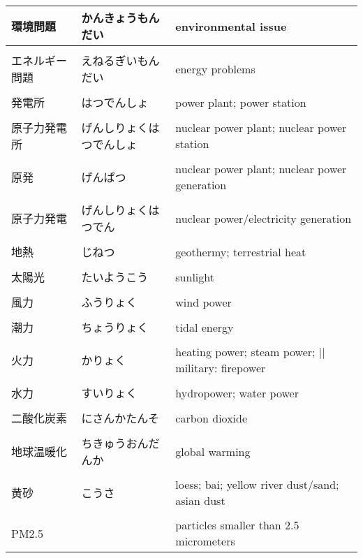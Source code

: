 \documentclass{article}
\begin{document}
\begin{tabular}{ l | l | p{10.5cm} }
環境問題        &かんきょうもんだい         &environmental issue \\ \hline \\[-1em]
エネルギー問題  &えねるぎいもんだい         &energy problems \\ \hline \\[-1em]
発電所          &はつでんしょ               &power plant; power station \\ \hline \\[-1em]
原子力発電所    &げんしりょくはつでんしょ   &nuclear power plant; nuclear power station \\ \hline \\[-1em]
原発            &げんぱつ                   &nuclear power plant; nuclear power generation \\ \hline \\[-1em]
原子力発電      &げんしりょくはつでん       &nuclear power/electricity generation \\ \hline \\[-1em]
地熱            &じねつ                     &geothermy; terrestrial heat \\ \hline \\[-1em]
太陽光          &たいようこう               &sunlight \\ \hline \\[-1em]
風力            &ふうりょく                 &wind power \\ \hline \\[-1em]
潮力            &ちょうりょく               &tidal energy \\ \hline \\[-1em]
火力            &かりょく                   &heating power; steam power; || military: firepower \\ \hline \\[-1em]
水力            &すいりょく                 &hydropower; water power \\ \hline \\[-1em]
二酸化炭素      &にさんかたんそ             &carbon dioxide \\ \hline \\[-1em]
地球温暖化      &ちきゅうおんだんか         &global warming \\ \hline \\[-1em]
黄砂            &こうさ                     &loess; bai; yellow river dust/sand; asian dust \\ \hline \\[-1em]
PM2.5           &                           &particles smaller than 2.5 micrometers \\[-1em]
\end{tabular}
\end{document}
